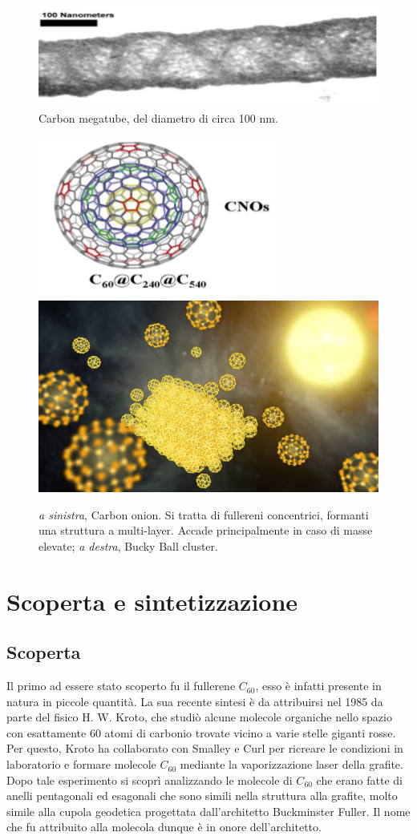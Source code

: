 \documentclass[a4paper,titlepage]{book}
\begin{document}
\begin{figure}[h!] 
	\centering
	\includegraphics[width=0.6\columnwidth]{megatube.png}
	\caption{ 	\label{meg}
	Carbon megatube, del diametro di circa 100 nm.}
\end{figure}
\begin{figure}[h!]
	\centering
	\includegraphics[width=.49\textwidth]{onion.png}\hfil
	\includegraphics[width=.49\textwidth]{buckyball.png}
	
	\caption{\textit{a sinistra}, Carbon onion. Si tratta di fullereni concentrici, formanti una struttura a multi-layer. Accade principalmente in caso di masse elevate; \textit{a destra}, Bucky Ball cluster. }\label{ONYO}
\end{figure}

\newpage
\section{Scoperta e sintetizzazione}
\subsection{Scoperta}
Il primo ad essere stato scoperto fu il fullerene $C_{60}$, esso è infatti presente in natura in piccole quantità. La sua recente sintesi è da attribuirsi nel 1985 da parte del fisico H. W. Kroto, che studiò alcune molecole organiche nello spazio con esattamente 60 atomi di carbonio trovate vicino a varie stelle giganti rosse. Per questo, Kroto ha collaborato con Smalley e Curl per ricreare le condizioni in laboratorio e formare molecole $C_{60}$ mediante la vaporizzazione laser della grafite. Dopo tale esperimento si scoprì analizzando le molecole di $C_{60}$  che erano fatte di anelli pentagonali ed esagonali che sono simili nella struttura alla grafite, molto simile alla cupola geodetica progettata dall'architetto Buckminster Fuller. Il nome che fu attribuito alla molecola dunque è in onore dell'architetto.
\end{document}
